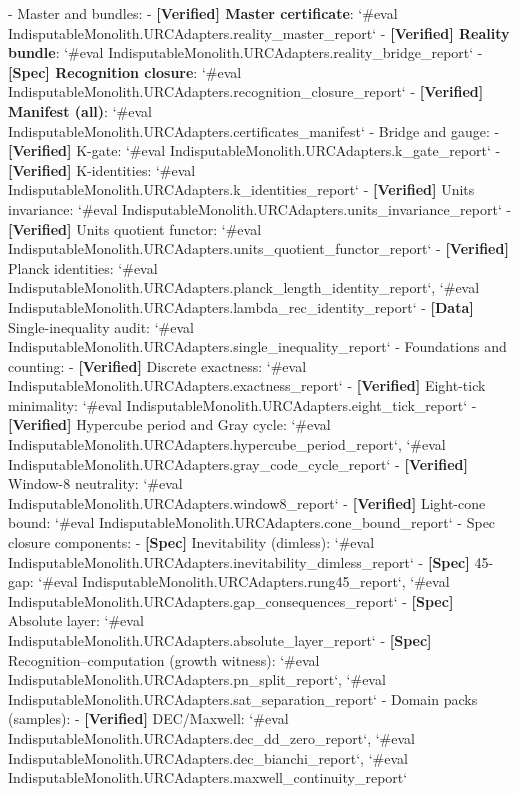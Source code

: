 \documentclass[11pt,a4paper,twoside]{article}
\numberwithin{equation}{section}
\theoremstyle{customthm}
\theoremstyle{customdef}
\theoremstyle{customrem}
\begin{document}
 - Master and bundles:
  - \textbf{[Verified] Master certificate}: `#eval IndisputableMonolith.URCAdapters.reality_master_report`
  - \textbf{[Verified] Reality bundle}: `#eval IndisputableMonolith.URCAdapters.reality_bridge_report`
  - \textbf{[Spec] Recognition closure}: `#eval IndisputableMonolith.URCAdapters.recognition_closure_report`
  - \textbf{[Verified] Manifest (all)}: `#eval IndisputableMonolith.URCAdapters.certificates_manifest`
 - Bridge and gauge:
  - \textbf{[Verified]} K-gate: `#eval IndisputableMonolith.URCAdapters.k_gate_report`
  - \textbf{[Verified]} K-identities: `#eval IndisputableMonolith.URCAdapters.k_identities_report`
  - \textbf{[Verified]} Units invariance: `#eval IndisputableMonolith.URCAdapters.units_invariance_report`
  - \textbf{[Verified]} Units quotient functor: `#eval IndisputableMonolith.URCAdapters.units_quotient_functor_report`
  - \textbf{[Verified]} Planck identities: `#eval IndisputableMonolith.URCAdapters.planck_length_identity_report`, `#eval IndisputableMonolith.URCAdapters.lambda_rec_identity_report`
  - \textbf{[Data]} Single-inequality audit: `#eval IndisputableMonolith.URCAdapters.single_inequality_report`
 - Foundations and counting:
  - \textbf{[Verified]} Discrete exactness: `#eval IndisputableMonolith.URCAdapters.exactness_report`
  - \textbf{[Verified]} Eight-tick minimality: `#eval IndisputableMonolith.URCAdapters.eight_tick_report`
  - \textbf{[Verified]} Hypercube period and Gray cycle: `#eval IndisputableMonolith.URCAdapters.hypercube_period_report`, `#eval IndisputableMonolith.URCAdapters.gray_code_cycle_report`
  - \textbf{[Verified]} Window-8 neutrality: `#eval IndisputableMonolith.URCAdapters.window8_report`
  - \textbf{[Verified]} Light-cone bound: `#eval IndisputableMonolith.URCAdapters.cone_bound_report`
 - Spec closure components:
  - \textbf{[Spec]} Inevitability (dimless): `#eval IndisputableMonolith.URCAdapters.inevitability_dimless_report`
  - \textbf{[Spec]} 45-gap: `#eval IndisputableMonolith.URCAdapters.rung45_report`, `#eval IndisputableMonolith.URCAdapters.gap_consequences_report`
  - \textbf{[Spec]} Absolute layer: `#eval IndisputableMonolith.URCAdapters.absolute_layer_report`
  - \textbf{[Spec]} Recognition–computation (growth witness): `#eval IndisputableMonolith.URCAdapters.pn_split_report`, `#eval IndisputableMonolith.URCAdapters.sat_separation_report`
 - Domain packs (samples):
  - \textbf{[Verified]} DEC/Maxwell: `#eval IndisputableMonolith.URCAdapters.dec_dd_zero_report`, `#eval IndisputableMonolith.URCAdapters.dec_bianchi_report`, `#eval IndisputableMonolith.URCAdapters.maxwell_continuity_report`
\end{document}
